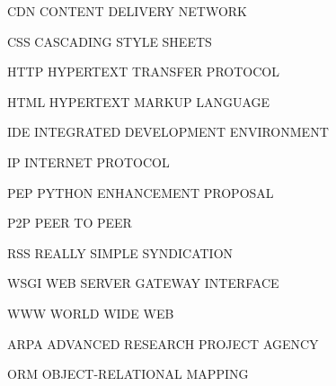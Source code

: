\begin{siglas}
  \item[CDN] CONTENT DELIVERY NETWORK
  \item[CSS] CASCADING STYLE SHEETS
  \item[HTTP] HYPERTEXT TRANSFER PROTOCOL 
  \item[HTML] HYPERTEXT MARKUP LANGUAGE 
  \item[IDE] INTEGRATED DEVELOPMENT ENVIRONMENT 
  \item[IP] INTERNET PROTOCOL 
  \item[PEP] PYTHON ENHANCEMENT PROPOSAL 
  \item[P2P] PEER TO PEER
  \item[RSS] REALLY SIMPLE SYNDICATION
  \item[WSGI] WEB SERVER GATEWAY INTERFACE
  \item[WWW] WORLD WIDE WEB 
  \item[ARPA] ADVANCED RESEARCH PROJECT AGENCY
  \item[ORM] OBJECT-RELATIONAL MAPPING
\end{siglas}